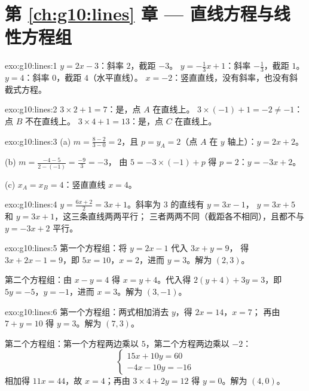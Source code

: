 \section*{第 \ref{ch:g10:lines} 章 --- 直线方程与线性方程组}

\begin{solution}{exo:g10:lines:1}
$y = 2x - 3$：斜率 $2$，截距 $-3$。
$y = -\frac13 x + 1$：斜率 $-\frac13$，截距 $1$。
$y = 4$：斜率 $0$，截距 $4$（水平直线）。
$x = -2$：竖直直线，没有斜率，也没有斜截式方程。
\end{solution}

\begin{solution}{exo:g10:lines:2}
$3 \times 2 + 1 = 7$：是，点 $A$ 在直线上。
$3 \times (-1) + 1 = -2 \neq -1$：点 $B$ 不在直线上。
$3 \times 4 + 1 = 13$：是，点 $C$ 在直线上。
\end{solution}

\begin{solution}{exo:g10:lines:3}
(a) $m = \frac{8 - 2}{3 - 0} = 2$，且 $p = y_A = 2$（点 $A$ 在
$y$ 轴上）：$y = 2x + 2$。

(b) $m = \frac{-4 - 5}{2 - (-1)} = \frac{-9}{3} = -3$，
由 $5 = -3 \times (-1) + p$ 得 $p = 2$：$y = -3x + 2$。

(c) $x_A = x_B = 4$：竖直直线 $x = 4$。
\end{solution}

\begin{solution}{exo:g10:lines:4}
$y = \frac{6x+2}{2} = 3x + 1$。斜率为 $3$ 的直线有 $y = 3x - 1$，
$y = 3x + 5$ 和 $y = 3x + 1$，这三条直线两两平行；
三者两两不同（截距各不相同），且都不与
$y = -3x + 2$ 平行。
\end{solution}

\begin{solution}{exo:g10:lines:5}
第一个方程组：将 $y = 2x - 1$ 代入 $3x + y = 9$，
得 $3x + 2x - 1 = 9$，即 $5x = 10$，$x = 2$，进而 $y = 3$。解为
$(2, 3)$。

第二个方程组：由 $x - y = 4$ 得 $x = y + 4$。代入得
$2(y + 4) + 3y = 3$，即 $5y = -5$，$y = -1$，进而 $x = 3$。解为
$(3, -1)$。
\end{solution}

\begin{solution}{exo:g10:lines:6}
第一个方程组：两式相加消去 $y$，得 $2x = 14$，$x = 7$；
再由 $7 + y = 10$ 得 $y = 3$。解为 $(7, 3)$。

第二个方程组：第一个方程两边乘以 $5$，第二个方程两边乘以 $-2$：
\[
\begin{cases}
15x + 10y = 60 \\
-4x - 10y = -16
\end{cases}
\]
相加得 $11x = 44$，故 $x = 4$；再由 $3 \times 4 + 2y = 12$ 得
$y = 0$。解为 $(4, 0)$。
\end{solution}

